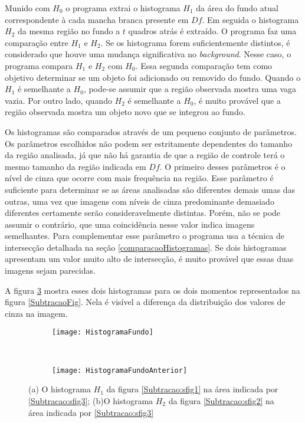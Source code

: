     Munido com $H_{0}$ o programa extrai o histograma $H_{1}$ da área do fundo atual correspondente à cada mancha branca presente em $Df$. Em seguida o histograma $H_{2}$ da mesma região no fundo a $t$ quadros atrás é extraído.  O programa faz uma comparação entre $H_{1}$ e $H_{2}$. Se os histograma forem suficientemente distintos, é considerado que houve uma mudança significativa no \textit{background}. Nesse caso, o programa compara $H_{1}$ e $H_{2}$ com $H_{0}$. Essa segunda comparação tem como objetivo determinar se um objeto foi adicionado ou removido do fundo. Quando o $H_{1}$ é semelhante a $H_{0}$, pode-se assumir que a região observada mostra uma vaga vazia. Por outro lado, quando $H_{2}$ é semelhante a $H_{0}$, é muito provável que a região observada mostra um objeto novo que se integrou ao fundo.

    Os histogramas são comparados através de um pequeno conjunto de parâmetros. Os parâmetros escolhidos não podem ser estritamente dependentes do tamanho da região analisada, já que não há garantia de que a região de controle terá o mesmo tamanho da região indicada em $Df$. O primeiro desses parâmetros é o nível de cinza que ocorre com mais frequência na região. Esse parâmetro é suficiente para determinar se as áreas analisadas são diferentes demais umas das outras, uma vez que imagens com níveis de cinza predominante demasiado diferentes certamente serão consideravelmente distintas. Porém, não se pode assumir o contrário, que uma coincidência nesse valor indica imagens semelhantes. Para complementar esse parâmetro o programa usa a técnica de intersecção detalhada na seção \ref{comparacaoHistogramas}. Se dois histogramas apresentam um valor muito alto de intersecção, é muito provável que essas duas imagens sejam parecidas.

    A figura \ref{DiferencaHistogramaFig} mostra esses dois histogramas para os dois momentos representados na figura \ref{SubtracaoFig}. Nela é visível a diferença da distribuição dos valores de cinza na imagem.


\begin{figure}
 \centering
\begin{subfigure}{.5\textwidth}
  \centering
  \texttt{[image: HistogramaFundo]}
  \caption{}
  \label{DiferencaHistogramaFig:sfig1}
\end{subfigure}\


\begin{subfigure}{.5\textwidth}
  \centering
  \texttt{[image: HistogramaFundoAnterior]}
  \caption{}
  \label{DiferencaHistogramaFig:sfig2}
\end{subfigure}
\caption{(a) O histograma $H_{1}$ da figura \ref{Subtracao:sfig1} na área indicada por \ref{Subtracao:sfig3}; (b)O histograma $H_{2}$ da figura \ref{Subtracao:sfig2} na área indicada por \ref{Subtracao:sfig3}}
\label{DiferencaHistogramaFig}
\end{figure}

